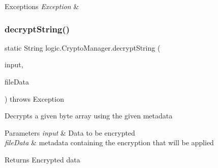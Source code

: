 \begin{DoxyExceptions}{Exceptions}
{\em Exception} & \\
\hline
\end{DoxyExceptions}
\mbox{\label{classlogic_1_1_crypto_manager_a50efd094cbcfb11a49a74007ddb05155}} 
\subsubsection{\texorpdfstring{decrypt\+String()}{decryptString()}}
{\footnotesize\ttfamily static String logic.\+Crypto\+Manager.\+decrypt\+String (\begin{DoxyParamCaption}\item[{byte \mbox{[}$\,$\mbox{]}}]{input,  }\item[{\mbox{\hyperlink{classpersistence_1_1_meta_data}{Meta\+Data}}}]{file\+Data }\end{DoxyParamCaption}) throws Exception\hspace{0.3cm}{\ttfamily [static]}}

Decrypts a given byte array using the given metadata 
\begin{DoxyParams}{Parameters}
{\em input} & Data to be encrypted \\
\hline
{\em file\+Data} & metadata containing the encryption that will be applied \\
\hline
\end{DoxyParams}
\begin{DoxyReturn}{Returns}
Encrypted data 
\end{DoxyReturn}

